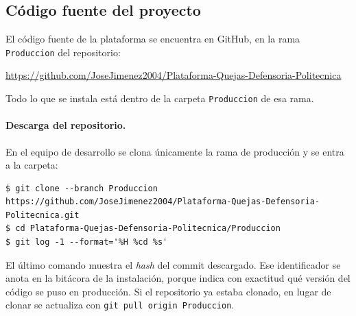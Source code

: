 \subsection{Código fuente del proyecto}\label{sec:4_1_codigo_fuente}
El código fuente de la plataforma se encuentra en GitHub, en la rama \texttt{Produccion} del repositorio:
\begin{center}
\url{https://github.com/JoseJimenez2004/Plataforma-Quejas-Defensoria-Politecnica}
\end{center}
Todo lo que se instala está dentro de la carpeta \texttt{Produccion} de esa rama.

\paragraph{Descarga del repositorio.} En el equipo de desarrollo se clona únicamente la rama de producción y se entra a la carpeta:
\begin{lstlisting}
$ git clone --branch Produccion https://github.com/JoseJimenez2004/Plataforma-Quejas-Defensoria-Politecnica.git
$ cd Plataforma-Quejas-Defensoria-Politecnica/Produccion
$ git log -1 --format='%H %cd %s'
\end{lstlisting}
El último comando muestra el \emph{hash} del commit descargado. Ese identificador se anota en la bitácora de la instalación, porque indica con exactitud qué versión del código se puso en producción. Si el repositorio ya estaba clonado, en lugar de clonar se actualiza con \texttt{git pull origin Produccion}.

